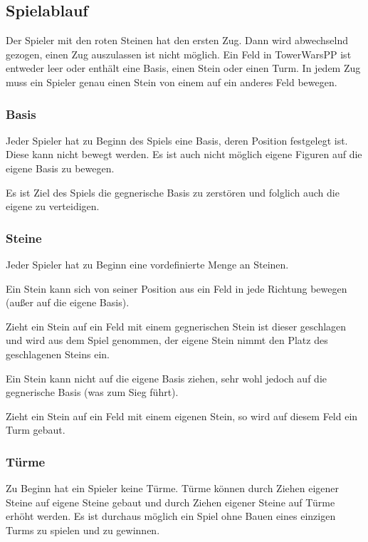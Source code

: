 \subsection*{Spielablauf}
Der Spieler mit den roten Steinen hat den ersten Zug. Dann wird abwechselnd gezogen, einen Zug auszulassen ist nicht möglich. Ein Feld in TowerWarsPP ist entweder leer oder enthält eine Basis, einen Stein oder einen Turm. In jedem Zug muss ein Spieler genau einen Stein von einem auf ein anderes Feld bewegen.

\subsubsection*{Basis}
Jeder Spieler hat zu Beginn des Spiels eine Basis, deren Position festgelegt ist. Diese kann nicht bewegt werden. Es ist auch nicht möglich eigene Figuren auf die eigene Basis zu bewegen.

Es ist Ziel des Spiels die gegnerische Basis zu zerstören und folglich auch die eigene zu verteidigen.

\subsubsection*{Steine}
Jeder Spieler hat zu Beginn eine vordefinierte Menge an Steinen. 

Ein Stein kann sich von seiner Position aus ein Feld in jede Richtung bewegen (außer auf die eigene Basis).

Zieht ein Stein auf ein Feld mit einem gegnerischen Stein ist dieser geschlagen und wird aus dem Spiel genommen, der eigene Stein nimmt den Platz des geschlagenen Steins ein.

Ein Stein kann nicht auf die eigene Basis ziehen, sehr wohl jedoch auf die gegnerische Basis (was zum Sieg führt).

Zieht ein Stein auf ein Feld mit einem eigenen Stein, so wird auf diesem Feld ein Turm gebaut.

\subsubsection*{Türme}
Zu Beginn hat ein Spieler keine Türme. Türme können durch Ziehen eigener Steine auf eigene Steine gebaut und durch Ziehen eigener Steine auf Türme erhöht werden. Es ist durchaus möglich ein Spiel ohne Bauen eines einzigen Turms zu spielen und zu gewinnen.

